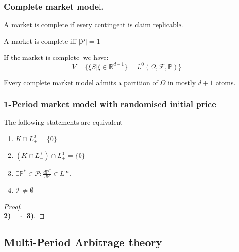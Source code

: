 \subsubsection{Complete market model.}

\begin{definition}
A market is complete if every contingent is claim replicable. 
\end{definition}

\begin{theorem}
	A market is complete iff $|\mathcal{P}| = 1$
\end{theorem}
\begin{remark}
If the market is complete, we have:
\begin{equation*}
	V = \{\bar{\xi}\bar{S}|\bar{\xi} \in \mathbb{R}^{d+1}\} = L^0(\Omega, \mathcal{F}, \mathbb{P})\}
\end{equation*}	
\end{remark}

\begin{theorem}
	Every complete market model admits a partition of $\Omega$ in mostly $d+1$ atoms.
\end{theorem}


\subsubsection{1-Period market model with randomised initial price}
\begin{theorem}
The following statements are equivalent
\begin{enumerate}
	\item $K \cap L^0_+ = \{0\}$
	\item $(K \cap L^0_+) \cap L_+^0 = \{0\}$
	\item $\exists \mathbb{P}^* \in \mathcal{P}: \frac{d\mathbb{P}^*}{d\mathbb{P}} \in L^\infty$. 
	\item $\mathcal{P} \neq \emptyset$
\end{enumerate}
\end{theorem}
\begin{proof}
\quad\\
\textbf{2) $\Rightarrow$ 3)}.
\end{proof}


\subsection{Multi-Period Arbitrage theory}
